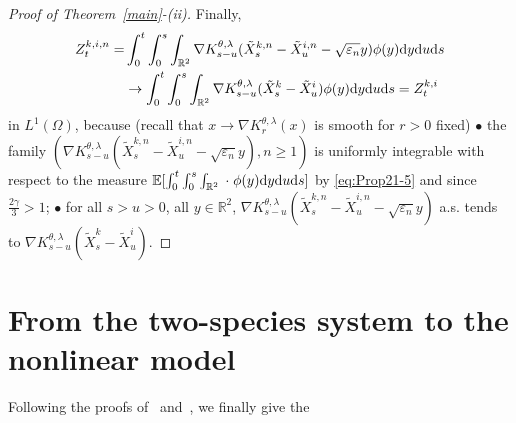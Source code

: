 \documentclass[11pt]{article}
\newcommand{\E}{\mathbb{E}}
\newcommand{\R}{\mathbb{R}}
\newcommand{\1}{\mathbbm{1}}
\newcommand{\tX}{\tilde X}
\newcommand{\dd}{{\rm d}}
\newcommand{\e}{\varepsilon}
\newcommand{\vip}{\vskip5pt}
\begin{document}
\begin{proof}[Proof of Theorem~\ref{main}-(ii)]
\vip
Finally, 
\begin{align*}
Z_t^{k,i,n}=&\int_0^t \int_0^s \int_{\R^2}\nabla K^{\theta,\lambda}_{s-u}(\tX^{k,n}_s-\tX^{i,n}_u-\sqrt{\e_n}y)\phi(y)\dd y \dd u \dd s\\
&\to  \int_0^t \int_0^s \int_{\R^2}\nabla K^{\theta,\lambda}_{s-u}(\tX^{k}_s-\tX^{i}_u)\phi(y)\dd y \dd u \dd s =Z_t^{k,i}
\end{align*}
in $L^1(\Omega)$, because (recall that $x\to \nabla K^{\theta,\lambda}_{r} (x)$ is smooth for $r>0$ fixed)
\vip
\noindent $\bullet$ the family $(\nabla K^{\theta,\lambda}_{s-u}(\tX^{k,n}_s-\tX^{i,n}_u-\sqrt{\e_n}y), n\geq 1)$
is uniformly integrable with respect to the measure 
$\E[\int_0^t \int_0^s\int_{\R^2} \;\cdot\; \phi(y)\dd y\dd u \dd s]$ by \eqref{eq:Prop21-5} and since $\frac{2\gamma}{3}>1$;
\vip
\noindent $\bullet$ for all $s>u>0$, all $y\in \R^2$,  $\nabla K^{\theta,\lambda}_{s-u}(\tX^{k,n}_s-\tX^{i,n}_u - \sqrt{\e_n}y)$
a.s. tends to $\nabla K^{\theta,\lambda}_{s-u}(\tX^{k}_s-\tX^{i}_u)$.
\end{proof}




\section{From the two-species system to the nonlinear model}
\label{tstks}

Following the proofs of~\cite[Theorem~6]{fournier-jourdain} and~\cite[Theorem 14]{FT1}, we
finally give the
\end{document}

